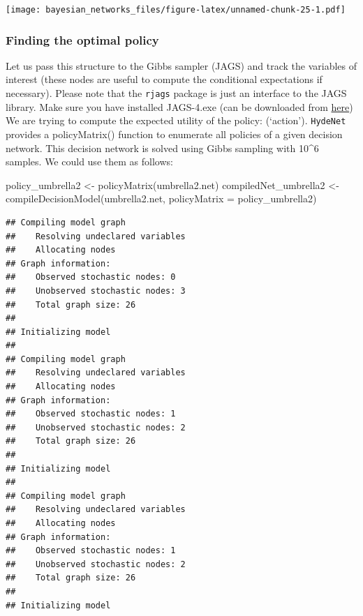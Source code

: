\documentclass[
]{article}
\newenvironment{Shaded}{\begin{snugshade}}{\end{snugshade}}
\newcommand{\AttributeTok}[1]{\textcolor[rgb]{0.77,0.63,0.00}{#1}}
\newcommand{\FunctionTok}[1]{\textcolor[rgb]{0.00,0.00,0.00}{#1}}
\newcommand{\NormalTok}[1]{#1}
\newcommand{\OtherTok}[1]{\textcolor[rgb]{0.56,0.35,0.01}{#1}}
\begin{document}
\texttt{[image: bayesian\_networks\_files/figure-latex/unnamed-chunk-25-1.pdf]}

\hypertarget{finding-the-optimal-policy-1}{%
\subsubsection{Finding the optimal policy}\label{finding-the-optimal-policy-1}}

Let us pass this structure to the Gibbs sampler (JAGS) and track the variables of interest (these nodes are useful to compute the conditional expectations if necessary).
Please note that the \texttt{rjags} package is just an interface to the JAGS library. Make sure you have installed JAGS-4.exe (can be downloaded from \href{http://www.sourceforge.net/projects/mcmc-jags/files}{here})
We are trying to compute the expected utility of the policy: (`action').
\texttt{HydeNet} provides a policyMatrix() function to enumerate all policies of a given decision network. This decision network is solved using Gibbs sampling with 10\^{}6 samples. We could use them as follows:

\begin{Shaded}
\begin{Highlighting}[]
\NormalTok{policy\_umbrella2 }\OtherTok{\textless{}{-}} \FunctionTok{policyMatrix}\NormalTok{(umbrella2.net)}
\NormalTok{compiledNet\_umbrella2 }\OtherTok{\textless{}{-}} \FunctionTok{compileDecisionModel}\NormalTok{(umbrella2.net, }\AttributeTok{policyMatrix =}\NormalTok{ policy\_umbrella2)}
\end{Highlighting}
\end{Shaded}

\begin{verbatim}
## Compiling model graph
##    Resolving undeclared variables
##    Allocating nodes
## Graph information:
##    Observed stochastic nodes: 0
##    Unobserved stochastic nodes: 3
##    Total graph size: 26
## 
## Initializing model
## 
## Compiling model graph
##    Resolving undeclared variables
##    Allocating nodes
## Graph information:
##    Observed stochastic nodes: 1
##    Unobserved stochastic nodes: 2
##    Total graph size: 26
## 
## Initializing model
## 
## Compiling model graph
##    Resolving undeclared variables
##    Allocating nodes
## Graph information:
##    Observed stochastic nodes: 1
##    Unobserved stochastic nodes: 2
##    Total graph size: 26
## 
## Initializing model
\end{verbatim}
\end{document}
